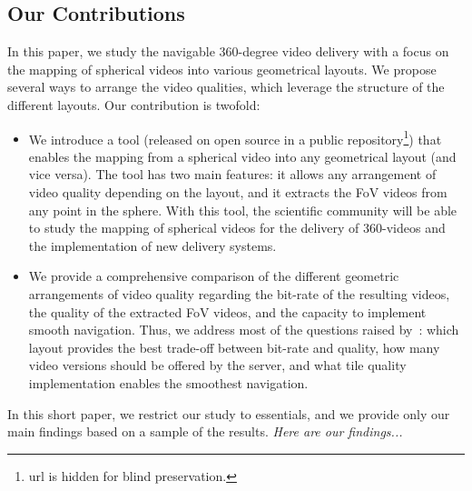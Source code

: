 \subsection{Our Contributions}

In this paper, we study the navigable 360-degree video delivery with a focus on the mapping 
of spherical videos into various geometrical layouts. We propose
several ways to arrange the video qualities, which leverage the structure of the
different layouts. Our contribution is twofold:
\begin{itemize}
\item We introduce a tool (released on open source in a public 
repository\footnote{url is hidden for blind
preservation.}) that enables the mapping from a spherical video
into any geometrical layout (and vice versa). The tool has two main features: it allows
any arrangement of video quality depending on the layout, and it 
extracts the 
\ac{FoV} videos from any point in the sphere. With this tool, the scientific community 
will be able to 
study the mapping of spherical videos for the delivery of 360-videos and the 
implementation of new delivery systems.
\item We provide a comprehensive comparison of the different geometric arrangements of
video quality regarding
the bit-rate of the resulting videos, the quality of the extracted \ac{FoV} videos, and the capacity to
implement smooth navigation. Thus, we address most of
the questions raised by~\citet{facebook}: which layout provides the best trade-off between bit-rate and
quality, how many video versions should be offered by the server, and what tile quality implementation 
enables the smoothest navigation.
\end{itemize}

In this short paper, we restrict our study to essentials, and we provide only our main findings based on a 
sample of the results. \textit{Here are our findings...}




